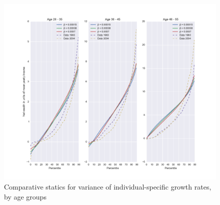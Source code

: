 \begin{figure}
\includegraphics[width=\columnwidth]{comp_stat_beta_agedetail}
\caption{Comparative statics for variance of individual-specific growth rates, by age groups}
\label{fig:comp_stat_beta_agedetail}
\end{figure}


